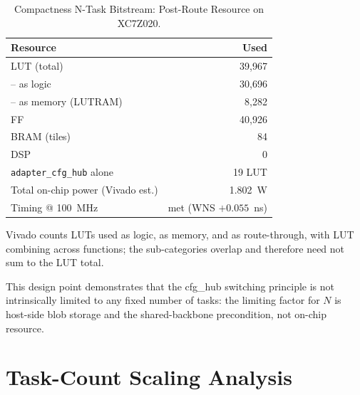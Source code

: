 \documentclass[12pt, a4paper]{report}
\numberwithin{equation}{chapter}
\numberwithin{figure}{chapter}
\numberwithin{table}{chapter}
\numberwithin{algorithm}{chapter}
\begin{document}
\begin{table}[H]
\centering
\caption{Compactness N-Task Bitstream: Post-Route Resource on XC7Z020.}
\label{tab:pe1_3ds_res}
\begin{tabular}{lr}
\toprule
\textbf{Resource} & \textbf{Used} \\
\midrule
LUT (total)                       & 39{,}967 \\
\hspace{1em}-- as logic           & 30{,}696 \\
\hspace{1em}-- as memory (LUTRAM) & 8{,}282 \\
FF                                & 40{,}926 \\
BRAM (tiles)                      & 84 \\
DSP                               & 0 \\
\texttt{adapter\_cfg\_hub} alone  & 19 LUT \\
Total on-chip power (Vivado est.) & 1.802~W \\
Timing @ 100~MHz                  & met (WNS $+0.055$~ns) \\
\bottomrule
\end{tabular}
\begin{flushleft}
\footnotesize Vivado counts LUTs used as logic, as memory, and as route-through, with LUT combining across functions; the sub-categories overlap and therefore need not sum to the LUT total.
\end{flushleft}
\end{table}

This design point demonstrates that the cfg\_hub switching principle is not intrinsically limited to any fixed number of tasks: the limiting factor for $N$ is host-side blob storage and the shared-backbone precondition, not on-chip resource.

\section{Task-Count Scaling Analysis}
\label{sec:scaling}
\end{document}
